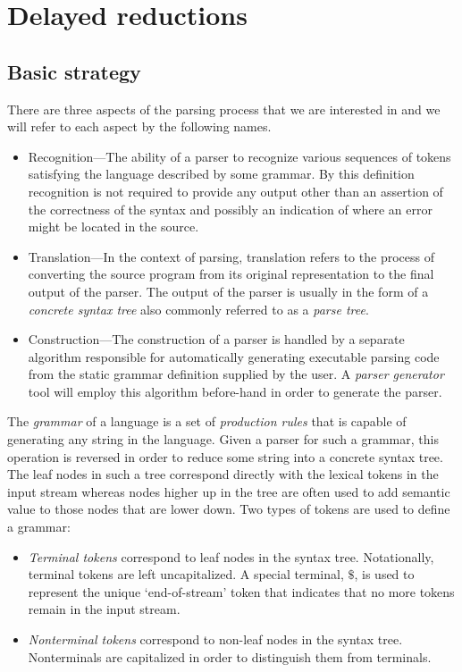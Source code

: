 \documentclass[a4paper,11pt]{article}
\begin{document}
\section{Delayed reductions}

\subsection{Basic strategy}

There are three aspects of the parsing process that we are interested in and we will refer to each aspect by the following names.
\begin{itemize}
\item Recognition---The ability of a parser to recognize various sequences of tokens satisfying the language described by some grammar. By this definition recognition is not required to provide any output other than an assertion of the correctness of the syntax and possibly an indication of where an error might be located in the source.
\item Translation---In the context of parsing, translation refers to the process of converting the source program from its original representation to the final output of the parser. The output of the parser is usually in the form of a \emph{concrete syntax tree} also commonly referred to as a \emph{parse tree}.
\item Construction---The construction of a parser is handled by a separate algorithm responsible for automatically generating executable parsing code from the static grammar definition supplied by the user. A \emph{parser generator} tool will employ this algorithm before-hand in order to generate the parser.
\end{itemize}

The \emph{grammar} of a language is a set of \emph{production rules} that is capable of generating any string in the language. 
Given a parser for such a grammar, this operation is reversed in order to reduce some string into a concrete syntax tree. 
The leaf nodes in such a tree correspond directly with the lexical tokens in the input stream whereas nodes higher up in the tree are often used to add semantic value to those nodes that are lower down.
Two types of tokens are used to define a grammar:
\begin{itemize}
\item \emph{Terminal tokens} correspond to leaf nodes in the syntax tree. Notationally, terminal tokens are left uncapitalized. A special terminal, $\$$, is used to represent the unique `end-of-stream' token that indicates that no more tokens remain in the input stream.
\item \emph{Nonterminal tokens} correspond to non-leaf nodes in the syntax tree. Nonterminals are capitalized in order to distinguish them from terminals.
\end{itemize}
\end{document}
